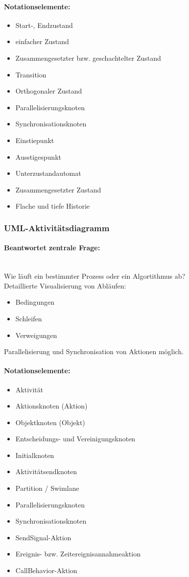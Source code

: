 \documentclass[../ZF_SWEN1.tex]{subfiles}
\begin{document}
\paragraph{Notationselemente:}
\begin{itemize}
	\item Start-, Endzustand
	\item einfacher Zustand
	\item Zusammengesetzter bzw. geschachtelter Zustand
	\item Transition
	\item Orthogonaler Zustand
	\item Parallelisierungsknoten
	\item Synchronisationsknoten
	\item Einstiepunkt
	\item Ausstigespunkt
	\item Unterzustandautomat
	\item Zusammengesetzter Zustand
	\item Flache und tiefe Historie
\end{itemize}


\subsubsection{UML-Aktivitätsdiagramm}
\paragraph{Beantwortet zentrale Frage:}\\
Wie läuft ein bestimmter Prozess oder ein Algortithmus ab?\\
Detaillierte Visualisierung von Abläufen:
\begin{itemize}
	\item Bedingungen
	\item Schleifen
	\item Verweigungen
\end{itemize}

Parallelisierung und Synchronisation von Aktionen möglich.

\paragraph{Notationselemente:}
\begin{itemize}
	\item Aktivität
	\item Aktionsknoten (Aktion)
	\item Objektknoten (Objekt)
	\item Entscheidungs- und Vereinigungsknoten
	\item Initialknoten
	\item Aktivitätsendknoten
	\item Partition / Swimlane
	\item Parallelisierungsknoten
	\item Synchronisationsknoten
	\item SendSignal-Aktion
	\item Ereignis- bzw. Zeitereignisannahmeaktion
	\item CallBehavior-Aktion
\end{itemize}
\end{document}
